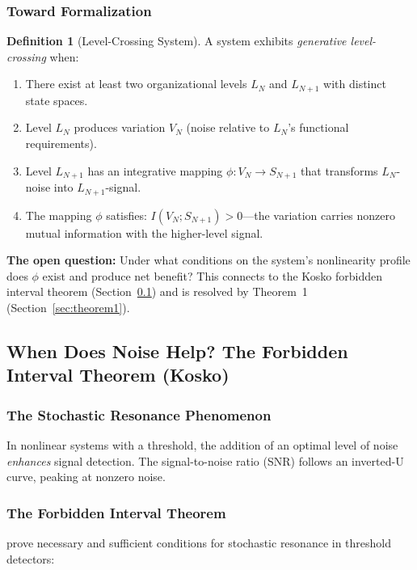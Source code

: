 \documentclass[12pt,letterpaper]{article}
\theoremstyle{definition}
\newtheorem{definition}[theorem]{Definition}
\theoremstyle{remark}
\begin{document}
\subsubsection{Toward Formalization}

\begin{definition}[Level-Crossing System]
\label{def:levelcrossing}
A system exhibits \emph{generative level-crossing} when:
\begin{enumerate}
    \item There exist at least two organizational levels $L_N$ and $L_{N+1}$ with distinct state spaces.
    \item Level $L_N$ produces variation $V_N$ (noise relative to $L_N$'s functional requirements).
    \item Level $L_{N+1}$ has an integrative mapping $\phi: V_N \to S_{N+1}$ that transforms $L_N$-noise into $L_{N+1}$-signal.
    \item The mapping $\phi$ satisfies: $I(V_N; S_{N+1}) > 0$---the variation carries nonzero mutual information with the higher-level signal.
\end{enumerate}
\end{definition}

\textbf{The open question:} Under what conditions on the system's nonlinearity profile does $\phi$ exist and produce net benefit? This connects to the Kosko forbidden interval theorem (Section~\ref{sec:kosko}) and is resolved by Theorem~1 (Section~\ref{sec:theorem1}).


\subsection{When Does Noise Help? The Forbidden Interval Theorem (Kosko)}
\label{sec:kosko}

\subsubsection{The Stochastic Resonance Phenomenon}

In nonlinear systems with a threshold, the addition of an optimal level of noise \emph{enhances} signal detection. The signal-to-noise ratio (SNR) follows an inverted-U curve, peaking at nonzero noise.

\subsubsection{The Forbidden Interval Theorem}

\citet{kosko2003} prove necessary and sufficient conditions for stochastic resonance in threshold detectors:
\end{document}
